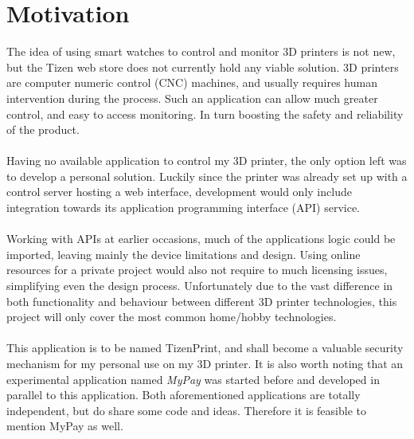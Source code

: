 \documentclass[a4paper, 12pt]{article}
\newcommand{\mysection}[1]{\section*{#1} \addcontentsline{toc}{section}{#1}}
\begin{document}
    \mysection{Motivation}
    The idea of using smart watches to control and monitor 3D printers is not new, but the Tizen web store does not
    currently hold any viable solution.
    3D printers are computer numeric control (CNC) machines, and usually requires human intervention during the
    process.
    Such an application can allow much greater control, and easy to access monitoring.
    In turn boosting the safety and reliability of the product.
    \\\\
    Having no available application to control my 3D printer, the only option left was to develop a personal
    solution.
    Luckily since the printer was already set up with a control server hosting a web interface, development would only
    include integration towards its application programming interface (API) service.
    \\\\
    Working with APIs at earlier occasions, much of the applications logic could be imported, leaving mainly the
    device limitations and design.
    Using online resources for a private project would also not require to much licensing issues, simplifying even the
    design process.
    Unfortunately due to the vast difference in both functionality and behaviour between different 3D printer
    technologies, this project will only cover the most common home/hobby technologies.
    \\\\
    This application is to be named TizenPrint, and shall become a valuable security mechanism for my personal use
    on my 3D printer.
    It is also worth noting that an experimental application named \textit{MyPay} was started before and developed
    in parallel to this application.
    Both aforementioned applications are totally independent, but do share some code and ideas.
    Therefore it is feasible to mention MyPay as well.

    \newpage
\end{document}
